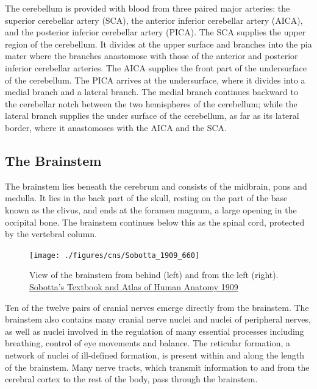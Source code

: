 The cerebellum is provided with blood from three paired major arteries: the superior cerebellar artery (SCA), the anterior inferior cerebellar artery (AICA), and the posterior inferior cerebellar artery (PICA). The SCA supplies the upper region of the cerebellum. It divides at the upper surface and branches into the pia mater where the branches anastomose with those of the anterior and posterior inferior cerebellar arteries. The AICA supplies the front part of the undersurface of the cerebellum. The PICA arrives at the undersurface, where it divides into a medial branch and a lateral branch. The medial branch continues backward to the cerebellar notch between the two hemispheres of the cerebellum; while the lateral branch supplies the under surface of the cerebellum, as far as its lateral border, where it anastomoses with the AICA and the SCA.

\hypertarget{the-brainstem}{%
\subsection{The Brainstem}\label{the-brainstem}}

The brainstem lies beneath the cerebrum and consists of the midbrain, pons and medulla. It lies in the back part of the skull, resting on the part of the base known as the clivus, and ends at the foramen magnum, a large opening in the occipital bone. The brainstem continues below this as the spinal cord, protected by the vertebral column.



\begin{figure}

{\centering \texttt{[image: ./figures/cns/Sobotta\_1909\_660]} 

}

\caption{View of the brainstem from behind (left) and from the left (right). \href{https://commons.wikimedia.org/wiki/File:Sobo_1909_660.png}{Sobotta's Textbook and Atlas of Human Anatomy 1909}}\label{fig:quadrigemina}
\end{figure}

Ten of the twelve pairs of cranial nerves emerge directly from the brainstem. The brainstem also contains many cranial nerve nuclei and nuclei of peripheral nerves, as well as nuclei involved in the regulation of many essential processes including breathing, control of eye movements and balance. The reticular formation, a network of nuclei of ill-defined formation, is present within and along the length of the brainstem. Many nerve tracts, which transmit information to and from the cerebral cortex to the rest of the body, pass through the brainstem.

